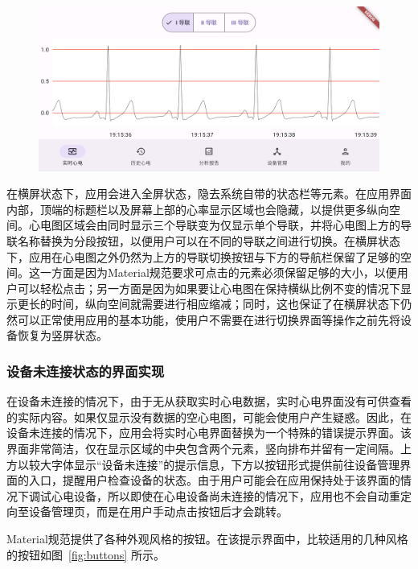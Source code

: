 \begin{figure}[ht]
    \includegraphics[width=\textwidth]{../assets/real-time-landscape}
    \label{fig:real-time-landscape}
\end{figure}

在横屏状态下，应用会进入全屏状态，隐去系统自带的状态栏等元素。在应用界面内部，顶端的标题栏以及屏幕上部的心率显示区域也会隐藏，以提供更多纵向空间。心电图区域会由同时显示三个导联变为仅显示单个导联，并将心电图上方的导联名称替换为分段按钮，以便用户可以在不同的导联之间进行切换。在横屏状态下，应用在心电图之外仍然为上方的导联切换按钮与下方的导航栏保留了足够的空间。这一方面是因为Material规范要求可点击的元素必须保留足够的大小，以便用户可以轻松点击；另一方面是因为如果要让心电图在保持横纵比例不变的情况下显示更长的时间，纵向空间就需要进行相应缩减；同时，这也保证了在横屏状态下仍然可以正常使用应用的基本功能，使用户不需要在进行切换界面等操作之前先将设备恢复为竖屏状态。

\subsubsection{设备未连接状态的界面实现}\label{subsubsec:real-time-na-ui}

在设备未连接的情况下，由于无从获取实时心电数据，实时心电界面没有可供查看的实际内容。如果仅显示没有数据的空心电图，可能会使用户产生疑惑。因此，在设备未连接的情况下，应用会将实时心电界面替换为一个特殊的错误提示界面。该界面非常简洁，仅在显示区域的中央包含两个元素，竖向排布并留有一定间隔。上方以较大字体显示“设备未连接”的提示信息，下方以按钮形式提供前往设备管理界面的入口，提醒用户检查设备的状态。由于用户可能会在应用保持处于该界面的情况下调试心电设备，所以即使在心电设备尚未连接的情况下，应用也不会自动重定向至设备管理页，而是在用户手动点击按钮后才会跳转。

Material规范提供了各种外观风格的按钮。在该提示界面中，比较适用的几种风格的按钮如图~\ref{fig:buttons} 所示。

